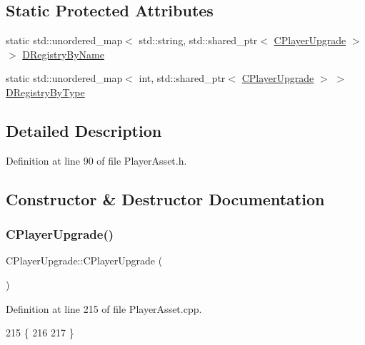 \subsection*{Static Protected Attributes}
\begin{DoxyCompactItemize}
\item 
static std\+::unordered\+\_\+map$<$ std\+::string, std\+::shared\+\_\+ptr$<$ \hyperlink{classCPlayerUpgrade}{C\+Player\+Upgrade} $>$ $>$ \hyperlink{classCPlayerUpgrade_a33e022bd67ce2f4d9ce83dfd0b7289f6}{D\+Registry\+By\+Name}
\item 
static std\+::unordered\+\_\+map$<$ int, std\+::shared\+\_\+ptr$<$ \hyperlink{classCPlayerUpgrade}{C\+Player\+Upgrade} $>$ $>$ \hyperlink{classCPlayerUpgrade_a04673f65215501e9eb0ce7828091c30c}{D\+Registry\+By\+Type}
\end{DoxyCompactItemize}


\subsection{Detailed Description}


Definition at line 90 of file Player\+Asset.\+h.



\subsection{Constructor \& Destructor Documentation}
\hypertarget{classCPlayerUpgrade_a6873b0eb480cf1514bc67b14959e1bea}{}\label{classCPlayerUpgrade_a6873b0eb480cf1514bc67b14959e1bea} 
\subsubsection{\texorpdfstring{C\+Player\+Upgrade()}{CPlayerUpgrade()}}
{\footnotesize\ttfamily C\+Player\+Upgrade\+::\+C\+Player\+Upgrade (\begin{DoxyParamCaption}{ }\end{DoxyParamCaption})}



Definition at line 215 of file Player\+Asset.\+cpp.


\begin{DoxyCode}
215                               \{
216 
217 \}
\end{DoxyCode}



